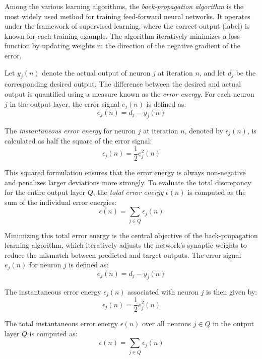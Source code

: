 Among the various learning algorithms, the \textit{back-propagation algorithm} is the most widely used method for training feed-forward neural networks. It operates under the framework of supervised learning, where the correct output (label) is known for each training example. The algorithm iteratively minimizes a loss function by updating weights in the direction of the negative gradient of the error.

Let $y_j(n)$ denote the actual output of neuron $j$ at iteration $n$, and let $d_j$ be the corresponding desired output. The difference between the desired and actual output is quantified using a measure known as the \textit{error energy}. For each neuron \( j \) in the output layer, the error signal \( e_j(n) \) is defined as:
\begin{equation}
	e_j(n) = d_j - y_j(n)
\end{equation}

The \textit{instantaneous error energy} for neuron \( j \) at iteration \( n \), denoted by \( \epsilon_j(n) \), is calculated as half the square of the error signal:
\begin{equation}
	\epsilon_j(n) = \frac{1}{2} e_j^2(n)
\end{equation}

This squared formulation ensures that the error energy is always non-negative and penalizes larger deviations more strongly. To evaluate the total discrepancy for the entire output layer \( Q \), the \textit{total error energy} \( \epsilon(n) \) is computed as the sum of the individual error energies:
\begin{equation}
	\epsilon(n) = \sum_{j \in Q} \epsilon_j(n)
\end{equation}

Minimizing this total error energy is the central objective of the back-propagation learning algorithm, which iteratively adjusts the network’s synaptic weights to reduce the mismatch between predicted and target outputs. The error signal $e_j(n)$ for neuron $j$ is defined as:
\begin{equation}
	e_j(n) = d_j - y_j(n)
\end{equation}

The instantaneous error energy $\epsilon_j(n)$ associated with neuron $j$ is then given by:
\begin{equation}
	\epsilon_j(n) = \frac{1}{2} e_j^2(n)
\end{equation}

The total instantaneous error energy $\epsilon(n)$ over all neurons $j \in Q$ in the output layer $Q$ is computed as:
\begin{equation}
	\epsilon(n) = \sum_{j \in Q} \epsilon_j(n)
\end{equation}

